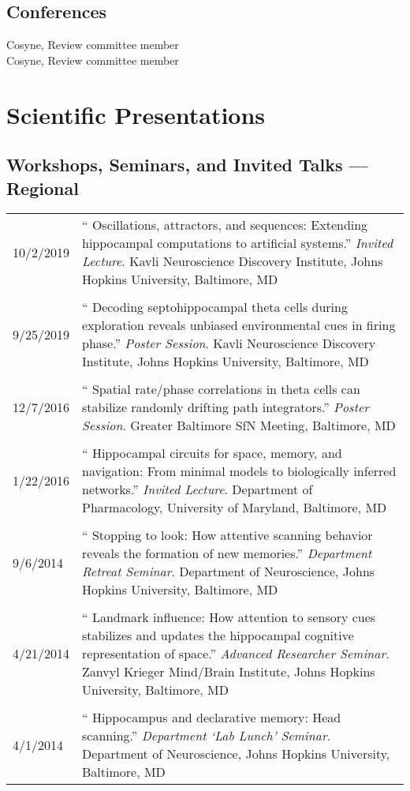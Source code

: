 \documentclass[10pt]{article}
\newcommand{\unpubtitle}[1]{{\color{hopkinsblue} #1}}
\newcommand{\lefttabline}[3]{\hspace{2ex}\makebox[#1][l]{#2} #3\\}
\begin{document}
\subsection*{Conferences}
\label{sec:confsvc}

\lefttabline{0.8in}{2020--2021}{Cosyne, Review committee member}
\lefttabline{0.8in}{2016}{Cosyne, Review committee member}

\section*{Scientific Presentations}
\label{sec:talks}

\subsection*{Workshops, Seminars, and Invited Talks --- Regional}

\begin{longtable}{@{\hspace{0.2in}}l>{\raggedright\arraybackslash}p{}}
  10/2/2019 \hspace{0.1in} & ``\unpubtitle{Oscillations, attractors, and
  sequences: Extending hippocampal computations to artificial systems}.''
  \emph{Invited Lecture}. Kavli Neuroscience Discovery Institute, Johns Hopkins
  University, Baltimore, MD\\
  \tabularnewline
  9/25/2019 & ``\unpubtitle{Decoding septohippocampal theta cells during
  exploration reveals unbiased environmental cues in firing phase}.''
  \emph{Poster Session}. Kavli Neuroscience Discovery Institute, Johns Hopkins
  University, Baltimore, MD\\
  \tabularnewline
  12/7/2016 & ``\unpubtitle{Spatial rate/phase correlations in theta cells
  can stabilize randomly drifting path integrators}.'' \emph{Poster Session}.
  Greater Baltimore SfN Meeting, Baltimore, MD\\
  \tabularnewline
  1/22/2016 & ``\unpubtitle{Hippocampal circuits for space, memory, and
  navigation: From minimal models to biologically inferred networks}.''
  \emph{Invited Lecture}. Department of Pharmacology, University of Maryland,
  Baltimore, MD\\
  \tabularnewline
  9/6/2014 & ``\unpubtitle{Stopping to look: How attentive scanning behavior
  reveals the formation of new memories}.'' \emph{Department Retreat Seminar}.
  Department of Neuroscience, Johns Hopkins University, Baltimore, MD\\
  \tabularnewline
  4/21/2014 & ``\unpubtitle{Landmark influence: How attention to sensory cues
  stabilizes and updates the hippocampal cognitive representation of space}.''
  \emph{Advanced Researcher Seminar}. Zanvyl Krieger Mind/Brain Institute, Johns
  Hopkins University, Baltimore, MD\\
  \tabularnewline
  4/1/2014 & ``\unpubtitle{Hippocampus and declarative memory:
  Head scanning}.'' \emph{Department `Lab Lunch' Seminar}. Department of
  Neuroscience, Johns Hopkins University, Baltimore, MD\\
\end{longtable}
\end{document}
